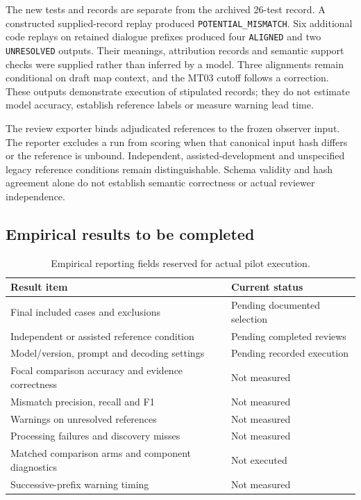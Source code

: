 The new tests and records are separate from the archived 26-test record.
A constructed supplied-record replay produced \texttt{POTENTIAL\_MISMATCH}.
Six additional code replays on retained dialogue prefixes produced four
\texttt{ALIGNED} and two \texttt{UNRESOLVED} outputs. Their meanings, attribution
records and semantic support checks were supplied rather than inferred by a
model. Three alignments remain conditional on draft map context, and the MT03
cutoff follows a correction. These outputs demonstrate execution of stipulated
records; they do not estimate model accuracy, establish reference labels or
measure warning lead time.

The review exporter binds adjudicated references to the frozen observer input.
The reporter excludes a run from scoring when that canonical input hash differs
or the reference is unbound. Independent, assisted-development and unspecified
legacy reference conditions remain distinguishable. Schema validity and hash
agreement alone do not establish semantic correctness or actual reviewer
independence.

\subsection{Empirical results to be completed}
\begin{table}[htbp]
\centering
\begin{tabular}{ll}
\hline
Result item & Current status \\
\hline
Final included cases and exclusions & Pending documented selection \\
Independent or assisted reference condition & Pending completed reviews \\
Model/version, prompt and decoding settings & Pending recorded execution \\
Focal comparison accuracy and evidence correctness & Not measured \\
Mismatch precision, recall and F1 & Not measured \\
Warnings on unresolved references & Not measured \\
Processing failures and discovery misses & Not measured \\
Matched comparison arms and component diagnostics & Not executed \\
Successive-prefix warning timing & Not measured \\
\hline
\end{tabular}
\caption{Empirical reporting fields reserved for actual pilot execution.}
\label{tab:cim-empirical-pending}
\end{table}

